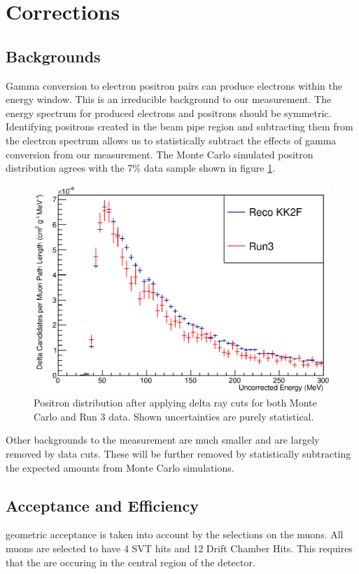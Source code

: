 \section{\deltaray Corrections}
\label{sec:corr}
\subsection{Backgrounds}
	Gamma conversion to electron positron pairs can produce electrons within the energy window. This is an irreducible background to our measurement. The energy spectrum for produced electrons and positrons should be symmetric. Identifying positrons created in the beam pipe region and subtracting them from the electron spectrum allows us to statistically subtract the effects of gamma conversion from our measurement. The Monte Carlo simulated positron distribution agrees with the 7\% data sample shown in figure \ref{posdist}.
	\begin{figure}[h]
		\label{posdist}
		\centering
		\includegraphics[scale=0.5]{figures/posdist.eps}
		\caption{Positron distribution after applying delta ray cuts for both Monte Carlo and Run 3 data. Shown uncertainties are purely statistical.}
	\end{figure}	
	
	Other backgrounds to the measurement are much smaller and are largely removed by data cuts. These will be further removed by statistically subtracting the expected amounts from Monte Carlo simulations.

\subsection{Acceptance and Efficiency}
	\babar geometric acceptance is taken into account by the selections on the muons. All muons are selected to have 4 SVT hits and 12 Drift Chamber Hits. This requires that the \deltarays are occuring in the central region of the detector.
	
